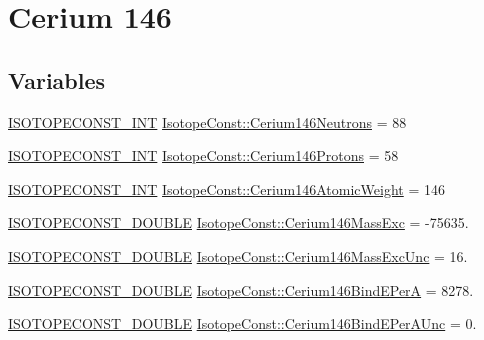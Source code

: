 \hypertarget{group___isotope_const-_cerium-_ce146}{}\section{Cerium 146}
\label{group___isotope_const-_cerium-_ce146}
\subsection*{Variables}
\begin{DoxyCompactItemize}
\item 
\mbox{\hyperlink{group___isotope_const-_macros_ga5f18360b3e99483a35c32d789e62621c}{I\+S\+O\+T\+O\+P\+E\+C\+O\+N\+S\+T\+\_\+\+I\+NT}} \mbox{\hyperlink{group___isotope_const-_cerium-_ce146_ga983d5d8d4bd9de03e1e65aab83eb8b7a}{Isotope\+Const\+::\+Cerium146\+Neutrons}} = 88
\item 
\mbox{\hyperlink{group___isotope_const-_macros_ga5f18360b3e99483a35c32d789e62621c}{I\+S\+O\+T\+O\+P\+E\+C\+O\+N\+S\+T\+\_\+\+I\+NT}} \mbox{\hyperlink{group___isotope_const-_cerium-_ce146_ga4cf0d0d670c3befb40b872a09ac5d03e}{Isotope\+Const\+::\+Cerium146\+Protons}} = 58
\item 
\mbox{\hyperlink{group___isotope_const-_macros_ga5f18360b3e99483a35c32d789e62621c}{I\+S\+O\+T\+O\+P\+E\+C\+O\+N\+S\+T\+\_\+\+I\+NT}} \mbox{\hyperlink{group___isotope_const-_cerium-_ce146_ga226917e46f5ee7e38e70671f3dd177dc}{Isotope\+Const\+::\+Cerium146\+Atomic\+Weight}} = 146
\item 
\mbox{\hyperlink{group___isotope_const-_macros_ga8f45a7272ce02c0b4c65c44636ed719a}{I\+S\+O\+T\+O\+P\+E\+C\+O\+N\+S\+T\+\_\+\+D\+O\+U\+B\+LE}} \mbox{\hyperlink{group___isotope_const-_cerium-_ce146_ga57ea407d1da4a44eb3d45db38970fa38}{Isotope\+Const\+::\+Cerium146\+Mass\+Exc}} = -\/75635.
\item 
\mbox{\hyperlink{group___isotope_const-_macros_ga8f45a7272ce02c0b4c65c44636ed719a}{I\+S\+O\+T\+O\+P\+E\+C\+O\+N\+S\+T\+\_\+\+D\+O\+U\+B\+LE}} \mbox{\hyperlink{group___isotope_const-_cerium-_ce146_gac2b7c197da52e5ee2f4279fddfbb616f}{Isotope\+Const\+::\+Cerium146\+Mass\+Exc\+Unc}} = 16.
\item 
\mbox{\hyperlink{group___isotope_const-_macros_ga8f45a7272ce02c0b4c65c44636ed719a}{I\+S\+O\+T\+O\+P\+E\+C\+O\+N\+S\+T\+\_\+\+D\+O\+U\+B\+LE}} \mbox{\hyperlink{group___isotope_const-_cerium-_ce146_gae86bbe8799c2b1547d8873353772dbc1}{Isotope\+Const\+::\+Cerium146\+Bind\+E\+PerA}} = 8278.
\item 
\mbox{\hyperlink{group___isotope_const-_macros_ga8f45a7272ce02c0b4c65c44636ed719a}{I\+S\+O\+T\+O\+P\+E\+C\+O\+N\+S\+T\+\_\+\+D\+O\+U\+B\+LE}} \mbox{\hyperlink{group___isotope_const-_cerium-_ce146_gac93840f703735f5131b791d66f9dac21}{Isotope\+Const\+::\+Cerium146\+Bind\+E\+Per\+A\+Unc}} = 0.

\end{DoxyCompactItemize}
